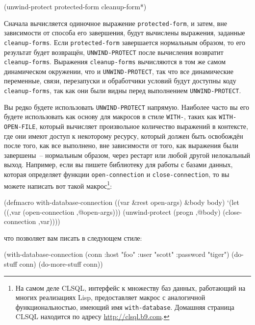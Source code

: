 \begin{myverb}
(unwind-protect protected-form
  cleanup-form*)
\end{myverb}

Сначала вычисляется одиночное выражение \lstinline{protected-form}, и затем, вне зависимости от
способа его завершения, будут вычислены выражения, заданные \lstinline{cleanup-forms}.  Если
\lstinline{protected-form} завершается нормальным образом, то его результат будет возвращён,
\lstinline{UNWIND-PROTECT} после вычисления возвратит \lstinline{cleanup-forms}. Выражения
\lstinline{cleanup-forms} вычисляются в том же самом динамическом окружении, что и
\lstinline{UNWIND-PROTECT}, так что все динамические переменные, связи, перезапуски и
обработчики условий будут доступны коду \lstinline{cleanup-forms}, так как они были видны
перед выполнением \lstinline{UNWIND-PROTECT}.

Вы редко будете использовать \lstinline{UNWIND-PROTECT} напрямую.  Наиболее часто вы его
будете использовать как основу для макросов в стиле \lstinline{WITH-}, таких как
\lstinline{WITH-OPEN-FILE}, который вычисляет произвольное количество выражений в контексте,
где они имеют доступ к некоторому ресурсу, который должен быть освобождён после того, как
все выполнено, вне зависимости от того, как выражения были завершены~-- нормальным
образом, через рестарт или любой другой нелокальный выход.  Например, если вы пишете
библиотеку для работы с базами данных, которая определяет функции \lstinline{open-connection} и
\lstinline{close-connection}, то вы можете написать вот такой макрос\footnote{На самом
  деле CLSQL, интерфейс к множеству баз данных, работающий на многих реализациях Lisp,
  предоставляет макрос с аналогичной функциональностью, имеющий имя \lstinline{with-database}.
  Домашняя страница CLSQL находится по адресу \url{http://clsql.b9.com}.}\hspace{\footnotenegspace}:

\begin{myverb}
(defmacro with-database-connection ((var &rest open-args) &body body)
  `(let ((,var (open-connection ,@open-args)))
    (unwind-protect (progn ,@body)
      (close-connection ,var))))
\end{myverb}

\noindent{}что позволяет вам писать в следующем стиле:

\begin{myverb}
(with-database-connection (conn :host "foo" :user "scott" :password "tiger")
  (do-stuff conn)
  (do-more-stuff conn))
\end{myverb}

